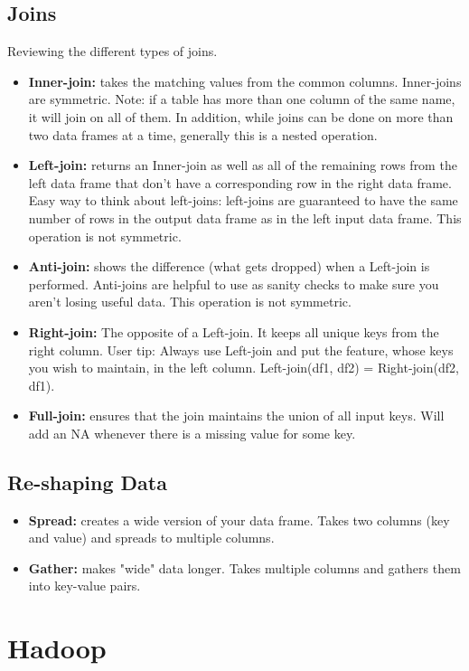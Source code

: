 \subsection{Joins}
Reviewing the different types of joins.
\begin{itemize}
\item \textbf{Inner-join:} takes the matching values from the common columns. Inner-joins are symmetric. Note: if a table has more than one column of the same name, it will join on all of them. In addition, while joins can be done on more than two data frames at a time, generally this is a nested operation.
\item \textbf{Left-join:} returns an Inner-join as well as all of the remaining rows from the left data frame that don't have a corresponding row in the right data frame. Easy way to think about left-joins: left-joins are guaranteed to have the same number of rows in the output data frame as in the left input data frame. This operation is not symmetric.
\item \textbf{Anti-join:} shows the difference (what gets dropped) when a Left-join is performed. Anti-joins are helpful to use as sanity checks to make sure you aren't losing useful data. This operation is not symmetric.
\item \textbf{Right-join:} The opposite of a Left-join. It keeps all unique keys from the right column. User tip: Always use Left-join and put the feature, whose keys you wish to maintain, in the left column. Left-join(df1, df2) = Right-join(df2, df1). 
\item \textbf{Full-join:} ensures that the join maintains the union of all input keys. Will add an NA whenever there is a missing value for some key.
\end{itemize}
\subsection{Re-shaping Data}
\begin{itemize}
\item \textbf{Spread:} creates a wide version of your data frame. Takes two columns (key and value) and spreads to multiple columns. 
\item \textbf{Gather:} makes "wide" data longer. Takes multiple columns and gathers them into key-value pairs. 
\end{itemize}

\section{Hadoop}
